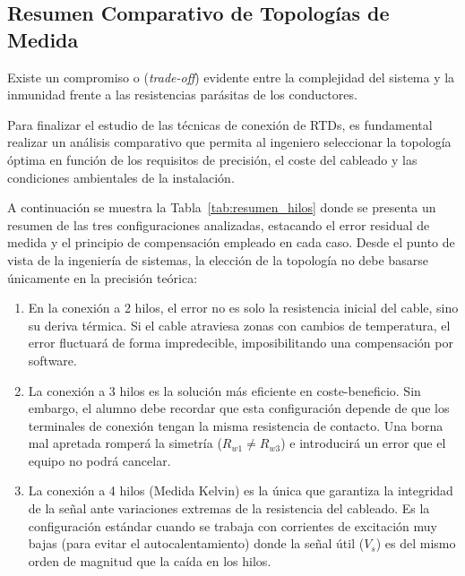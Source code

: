 \subsection{Resumen Comparativo de Topologías de Medida}

Existe un compromiso o 
(\emph{trade-off}) evidente entre la complejidad del sistema y la inmunidad frente a
las resistencias parásitas de los conductores.

Para finalizar el estudio de las técnicas de conexión de RTDs, es fundamental
realizar un análisis comparativo que permita al ingeniero seleccionar la
topología óptima en función de los requisitos de precisión, el coste del
cableado y las condiciones ambientales de la instalación.

A continuación se muestra la Tabla~\ref{tab:resumen_hilos} donde se presenta un resumen de las tres configuraciones analizadas,
estacando el error residual de medida y el principio de compensación empleado
en cada caso. Desde el punto de vista de la ingeniería de sistemas, la elección de la topología no debe basarse únicamente en la precisión teórica:
\begin{enumerate}
\item  En la conexión a 2 hilos, el error no es solo la resistencia inicial del
    cable, sino su deriva térmica. Si el cable atraviesa zonas con cambios de
    temperatura, el error fluctuará de forma impredecible, imposibilitando una
    compensación por software.
\item  La conexión a 3 hilos es la solución más eficiente en coste-beneficio. Sin
    embargo, el alumno debe recordar que esta configuración depende de que los
    terminales de conexión tengan la misma resistencia de contacto. Una borna
    mal apretada romperá la simetría ($R_{w1} \neq R_{w3}$) e introducirá un error
    que el equipo no podrá cancelar.
\item  La conexión a 4 hilos (Medida Kelvin) es la única que garantiza la
    integridad de la señal ante variaciones extremas de la resistencia del
    cableado. Es la configuración estándar cuando se trabaja con corrientes de
    excitación muy bajas (para evitar el autocalentamiento) donde la señal útil
    ($V_s$) es del mismo orden de magnitud que la caída en los hilos.
\end{enumerate}

